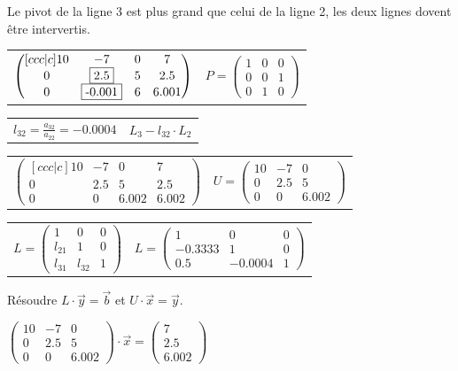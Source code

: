 \documentclass[a4paper,9pt]{extarticle}
\begin{document}
\begin{multicols*}{2}
Le pivot de la ligne 3 est plus grand que celui de la ligne 2, les deux lignes dovent être intervertis.

\begin{tabular}{ll}
$
\begin{pmatrix}[ccc|c]
 10 & -7 & 0   & 7    \\
 0 &  \fbox{2.5} &   5 & 2.5  \\
 0 & \fbox{-0.001} &   6  & 6.001
\end{pmatrix}
$
&
$
P=
\begin{pmatrix}
 1 & 0 & 0       \\
 0 & 0 & 1     \\
 0 & 1 & 0     
\end{pmatrix}
$
\end{tabular}

\begin{tabular}{ll}
$l_{32} = \frac{a_{32}}{a_{22}} = -0.0004$ & $L_3 - l_{32} \cdot L_2$ 
\end{tabular}

\begin{tabular}{ll}
$
\begin{pmatrix}[ccc|c]
 10 & -7 & 0   & 7    \\
 0 &  2.5 &   5 & 2.5  \\
 0 & 0 &   6.002  & 6.002
\end{pmatrix}
$
&
$
U=
\begin{pmatrix}
 10 & -7 & 0      \\
 0 &  2.5 &   5   \\
 0 & 0 &   6.002  
\end{pmatrix}
$
\end{tabular}

\begin{tabular}{ll}
$
L=
\begin{pmatrix}
 1 & 0 & 0      \\
 l_{21} & 1 & 0   \\
 l_{31} & l_{32} & 1 
\end{pmatrix}
$
&
$
L=
\begin{pmatrix}
 1 & 0 & 0      \\
 -0.3333 & 1 & 0   \\
 0.5 & -0.0004 & 1 
\end{pmatrix}
$
\end{tabular}

Résoudre $L\cdot \vec{y} = \vec{b}$ et $U \cdot \vec{x} = \vec{y}$.

$
\begin{pmatrix}
 10 & -7 & 0      \\
 0 &  2.5 &   5   \\
 0 & 0 &   6.002  
\end{pmatrix}
\cdot \vec{x} =
\begin{pmatrix}
7\\
2.5\\
6.002
\end{pmatrix}
$


\end{multicols*}
\end{document}
